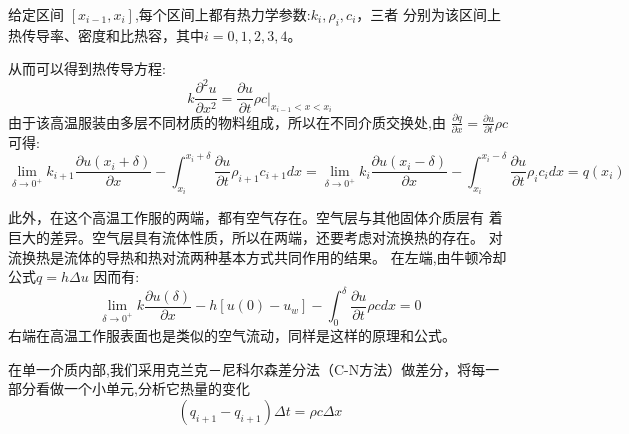 \documentclass{cumcmthesis}
\begin{document}
            给定区间 \([x_{i-1},x_i]\),每个区间上都有热力学参数:\(k_i,\rho_i,c_i\)，三者
            分别为该区间上热传导率、密度和比热容，其中\(i=0,1,2,3,4\)。

            从而可以得到热传导方程\cite{book}:
            \[k\frac{\partial^2 u}{\partial x^2} = \frac{\partial u}{\partial t}\rho c |_{x_{i-1}<x<x_{i}}\] 
            由于该高温服装由多层不同材质的物料组成，所以在不同介质交换处,由
            \(\frac{\partial{q}}{\partial{x}} = \frac{\partial{u}}{\partial{t}} \rho c \)
            可得:
            \[ 
                \lim_{\delta \to 0^+} 
                k_{i+1 }\frac{\partial{u(x_i+\delta)}}{\partial{x}} 
                -
                \int_{x_i}^{x_i+\delta}\frac{\partial{u}}{\partial{t}} \rho_{i+1} c_{i+1} dx 
                = 
                \lim_{\delta \to 0^+} 
                k_{i} \frac{\partial{u(x_i-\delta)}}{\partial{x}}
                - 
                \int_{x_i}^{x_i-\delta}\frac{\partial{u}}{\partial{t}} \rho_i c_i dx
                =
                q(x_i)
            \]

            此外，在这个高温工作服的两端，都有空气存在。空气层与其他固体介质层有
            着巨大的差异。空气层具有流体性质，所以在两端，还要考虑对流换热的存在。
            对流换热是流体的导热和热对流两种基本方式共同作用的结果。
            在左端,由牛顿冷却公式\(q = h\Delta u\)
            因而有:
            \[
                \lim_{\delta \to 0^+} 
                k\frac{\partial{u(\delta)}}{\partial{x}} 
                - 
                h[u(0) - u_w]
                -
                \int_{0}^{\delta}\frac{\partial{u}}{\partial{t}} \rho c dx 
                = 0
            \]
            右端在高温工作服表面也是类似的空气流动，同样是这样的原理和公式。

            在单一介质内部,我们采用克兰克－尼科尔森差分法（C-N方法）做差分，将每一部分看做一个小单元,分析它热量的变化
            \[(q_{i+1} - q_{i+1})\Delta t = \rho c \Delta x\]
\end{document}
